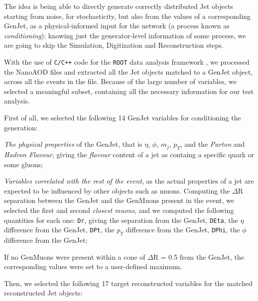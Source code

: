 The idea is being able to directly generate correctly distributed Jet objects starting from noise, for stochasticity,  but also from the values of a corresponding GenJet, as a physical-informed input for the network (a process known as \emph{conditioning}): knowing just the generator-level information of some process, we are going to skip the Simulation, Digitization and Reconstruction steps.


With the use of \texttt{C/C++} code for the \texttt{ROOT} data analysis framework \cite{Brun:491486}, we processed the NanoAOD files and extracted all the Jet objects matched to a GenJet object, across all the events in the file. Because of the large number of variables, we selected a meaningful subset, containing all the necessary information for our test analysis.

First of all, we selected the following 14 GenJet variables for conditioning the generation: 

\begin{outline}
\1 \emph{The physical properties} of the GenJet, that is $\eta$, $\phi$, $m_j$, $p_T$, and the \emph{Parton} and \emph{Hadron Flavour}, giving the \emph{flavour} content of a jet as containg a specific quark or some gluons;

\1 \emph{Variables correlated with the rest of the event}, as the actual properties of a jet are expected to be influenced by other objects such as muons. Computing the $\Delta$R separation between the GenJet and the GenMuons present in the event, we selected the first and second \emph{closest muons}, and we computed the following quantities for each one:
\2 \texttt{Dr}, giving the separation from the GenJet, \texttt{DEta}, the $\eta$ difference from the GenJet, \texttt{DPt}, the $p_T$ difference from the GenJet, \texttt{DPhi}, the $\phi$ difference from the GenJet;

\1 If no GenMuons were present within a cone of $\Delta$R = 0.5 from the GenJet, the corresponding values were set to a user-defined maximum.

\end{outline}

Then, we selected the following 17 target reconstructed variables for the matched reconstructed Jet objects:

